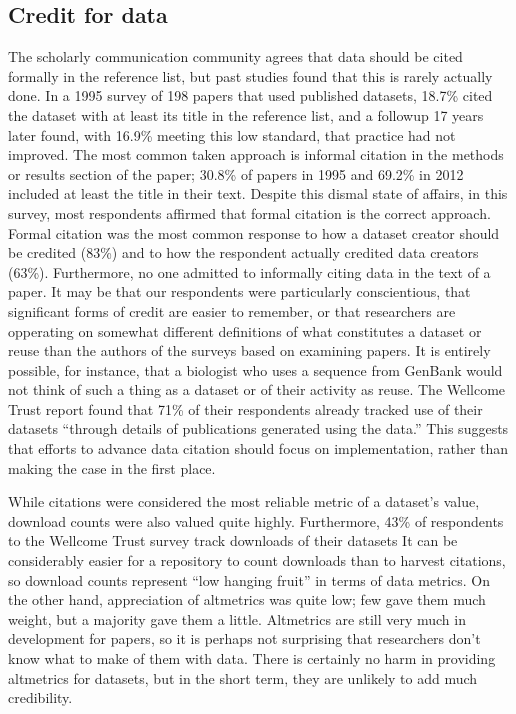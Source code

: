 \documentclass[10pt]{article}
\begin{document}
\subsection*{Credit for data}

The scholarly communication community agrees that data should be cited formally in the reference list,\cite{force11_data_citation_synthesis_group_joint_2014} but past studies found that this is rarely actually done.\cite{sieber_not_1995, mooney_citing_2011, mooney_anatomy_2012}
In a 1995 survey of 198 papers that used published datasets, 18.7\% cited the dataset with at least its title in the reference list\cite{sieber_not_1995}, and a followup 17 years later found, with 16.9\% meeting this low standard, that practice had not improved.\cite{mooney_anatomy_2012}
The most common taken approach is informal citation in the methods or results section of the paper; 30.8\% of papers in 1995 and 69.2\% in 2012 included at least the title in their text.
Despite this dismal state of affairs, in this survey, most respondents affirmed that formal citation is the correct approach.
Formal citation was the most common response to how a dataset creator should be credited (83\%) and to how the respondent actually credited data creators (63\%).
Furthermore, no one admitted to informally citing data in the text of a paper.
It may be that our respondents were particularly conscientious, that significant forms of credit are easier to remember, or that researchers are opperating on somewhat different definitions of what constitutes a dataset or reuse than the authors of the surveys based on examining papers.
It is entirely possible, for instance, that a biologist who uses a sequence from GenBank would not think of such a thing as a dataset or of their activity as reuse.
The Wellcome Trust report found that 71\% of their respondents already tracked use of their datasets ``through details of publications generated using the data.''\cite{bobrow_establishing_2014} 
This suggests that efforts to advance data citation should focus on implementation, rather than making the case in the first place.

While citations were considered the most reliable metric of a dataset's value, download counts were also valued quite highly.
Furthermore, 43\% of respondents to the Wellcome Trust survey track downloads of their datasets\cite{bobrow_establishing_2014}
It can be considerably easier for a repository to count downloads than to harvest citations, so download counts represent ``low hanging fruit'' in terms of data metrics.
On the other hand, appreciation of altmetrics was quite low; few gave them much weight, but a majority gave them a little.
Altmetrics are still very much in development for papers, so it is perhaps not surprising that researchers don't know what to make of them with data.
There is certainly no harm in providing altmetrics for datasets, but in the short term, they are unlikely to add much credibility.
\end{document}
